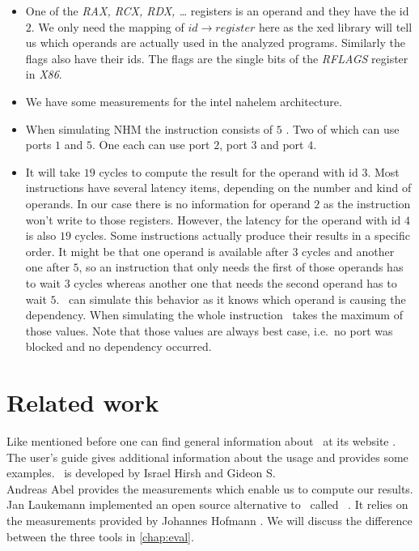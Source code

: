 \begin{itemize}
    \item One of the \emph{RAX, RCX, RDX, \dots} registers is an operand and they have the id $2$. We only need the mapping of $id \rightarrow register$ here as the xed library will tell us which operands are actually used in the analyzed programs. Similarly the flags also have their ids. The flags are the single bits of the \emph{RFLAGS} register in \emph{X86}.
    \item We have some measurements for the intel nahelem architecture.
    \item When simulating NHM the instruction consists of $5$ \microops. Two of which can use ports $1$ and $5$. One each can use port $2$, port $3$ and port $4$.
    \item It will take $19$ cycles to compute the result for the operand with id $3$. Most instructions have several latency items, depending on the number and kind of operands. In our case there is no information for operand $2$ as the instruction won't write to those registers. However, the latency for the operand with id $4$ is also $19$ cycles. Some instructions actually produce their results in a specific order. It might be that one operand is available after $3$ cycles and another one after $5$, so an instruction that only needs the first of those operands has to wait $3$ cycles whereas another one that needs the second operand has to wait $5$. \suaca\ can simulate this behavior as it knows which operand is causing the dependency. When simulating the whole instruction \suaca\ takes the maximum of those values. Note that those values are always best case, i.e.\ no port was blocked and no dependency occurred.
\end{itemize}


\section{Related work}

Like mentioned before one can find general information about \iaca\ at its website \cite{iaca}. The user's guide \cite{userguide} gives additional information about the usage and provides some examples. \iaca\ is developed by Israel Hirsh and Gideon S.\\

Andreas Abel \cite{Andreas} provides the measurements which enable us to compute our results.\\

Jan Laukemann \cite{osaca-thesis} implemented an open source alternative to \iaca\ called \osaca\ \cite{osaca-web}. It relies on the measurements provided by Johannes Hofmann \cite{ibench}. We will discuss the difference between the three tools in \autoref{chap:eval}.
